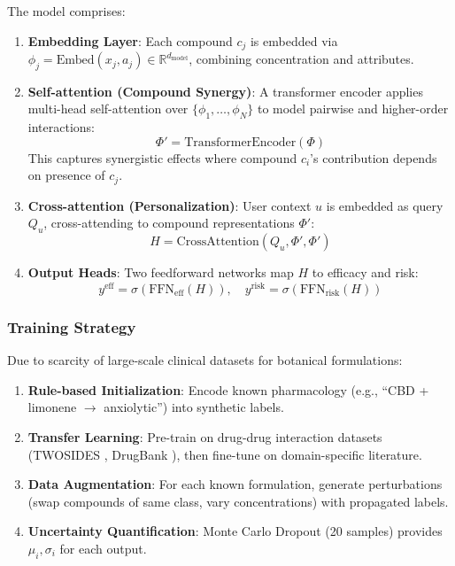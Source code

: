 \documentclass[11pt,a4paper]{article}
\begin{document}
The model comprises:
\begin{enumerate}
    \item \textbf{Embedding Layer}: Each compound \(c_j\) is embedded via \(\phi_j = \text{Embed}(x_j, a_j) \in \mathbb{R}^{d_{\text{model}}}\), combining concentration and attributes.
    
    \item \textbf{Self-attention (Compound Synergy)}: A transformer encoder applies multi-head self-attention over \(\{\phi_1, \dots, \phi_N\}\) to model pairwise and higher-order interactions:
    \[
    \Phi' = \text{TransformerEncoder}(\Phi)
    \]
    This captures synergistic effects where compound \(c_i\)'s contribution depends on presence of \(c_j\).
    
    \item \textbf{Cross-attention (Personalization)}: User context \(u\) is embedded as query \(Q_u\), cross-attending to compound representations \(\Phi'\):
    \[
    H = \text{CrossAttention}(Q_u, \Phi', \Phi')
    \]
    
    \item \textbf{Output Heads}: Two feedforward networks map \(H\) to efficacy and risk:
    \[
    y^{\text{eff}} = \sigma(\text{FFN}_{\text{eff}}(H)), \quad y^{\text{risk}} = \sigma(\text{FFN}_{\text{risk}}(H))
    \]
\end{enumerate}

\subsubsection{Training Strategy}

Due to scarcity of large-scale clinical datasets for botanical formulations:
\begin{enumerate}
    \item \textbf{Rule-based Initialization}: Encode known pharmacology (e.g., ``CBD + limonene \(\to\) anxiolytic'') into synthetic labels.
    \item \textbf{Transfer Learning}: Pre-train on drug-drug interaction datasets (TWOSIDES \cite{Tatonetti2012}, DrugBank \cite{Wishart2018}), then fine-tune on domain-specific literature.
    \item \textbf{Data Augmentation}: For each known formulation, generate perturbations (swap compounds of same class, vary concentrations) with propagated labels.
    \item \textbf{Uncertainty Quantification}: Monte Carlo Dropout (20 samples) provides \(\mu_i, \sigma_i\) for each output.
\end{enumerate}
\end{document}
